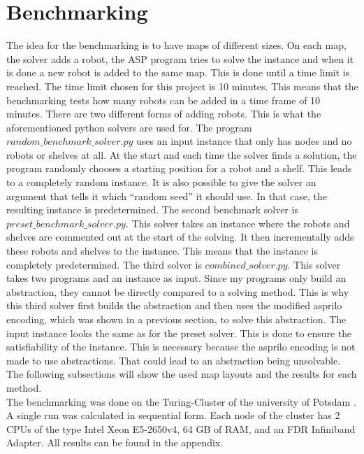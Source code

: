 \documentclass[runningheads]{llncs}
\begin{document}
\section{Benchmarking}
The idea for the benchmarking is to have maps of different sizes. On each map, the solver adds a robot, the ASP program tries to solve the instance and when it is done a new robot is added to the same map. This is done until a time limit is reached. The time limit chosen for this project is 10 minutes. This means that the benchmarking tests how many robots can be added in a time frame of 10 minutes. There are two different forms of adding robots. This is what the aforementioned python solvers are used for. The program $random\_benchmark\_solver.py$ uses an input instance that only has nodes and no robots or shelves at all. At the start and each time the solver finds a solution, the program randomly chooses a starting position for a robot and a shelf. This leads to a completely random instance. It is also possible to give the solver an argument that tells it which ``random seed'' it should use. In that case, the resulting instance is predetermined. The second benchmark solver is $preset\_benchmark\_solver.py$. This solver takes an instance where the robots and shelves are commented out at the start of the solving. It then incrementally adds these robots and shelves to the instance. This means that the instance is completely predetermined. The third solver is $combined\_solver.py$. This solver takes two programs and an instance as input. Since my programs only build an abstraction, they cannot be directly compared to a solving method. This is why this third solver first builds the abstraction and then uses the modified asprilo encoding, which was shown in a previous section, to solve this abstraction. The input instance looks the same as for the preset solver. This is done to ensure the satisfiability of the instance. This is necessary because the asprilo encoding is not made to use abstractions. That could lead to an abstraction being unsolvable. The following subsections will show the used map layouts and the results for each method. \\
The benchmarking was done on the Turing-Cluster of the university of Potsdam \cite{hpc}. A single run was calculated in sequential form. Each node of the cluster has 2 CPUs of the type Intel Xeon E5-2650v4, 64 GB of RAM, and an FDR Infiniband Adapter. All results can be found in the appendix.
\end{document}
